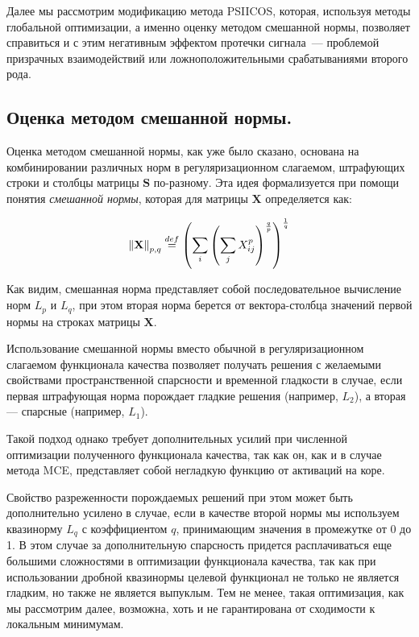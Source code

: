Далее мы рассмотрим модификацию метода PSIICOS, которая, используя методы глобальной
оптимизации, а именно оценку методом смешанной нормы, позволяет справиться и с этим
негативным эффектом протечки сигнала~--- проблемой призрачных взаимодействий
или ложноположительными срабатываниями второго рода.

\subsection{Оценка методом смешанной нормы.}\label{section_mixed_norm}

Оценка методом смешанной нормы, как уже было сказано, основана на
комбинировании различных норм в регуляризационном слагаемом, штрафующих строки
и столбцы матрицы $\mathbf{S}$ по-разному.  Эта идея формализуется при помощи понятия
\emph{смешанной нормы}, которая для матрицы $\mathbf{X}$ определяется как:

\begin{equation}
    \left\lVert\mathbf{X}\right\rVert_{p,q} \stackrel{def}{=}
        {\left(\sum_i {\left( \sum_j X_{ij}^p \right)}^{\frac{q}{p}}\right)}^{\frac{1}{q}}
    \label{mixed_norm_def}
\end{equation}

Как видим, смешанная норма представляет собой последовательное вычисление
норм $L_p$ и $L_q$, при этом вторая норма берется от вектора-столбца значений первой
нормы на строках матрицы $\mathbf{X}$.

Использование смешанной нормы вместо обычной в регуляризационном слагаемом
функционала качества позволяет получать решения с желаемыми свойствами
пространственной спарсности и временной гладкости в случае, если первая штрафующая норма
порождает гладкие решения (например, $L_2$), а вторая --- спарсные (например, $L_1$).

Такой подход однако требует дополнительных усилий при численной оптимизации
полученного функционала качества, так как он, как и в случае метода MCE,
представляет собой негладкую функцию от активаций на коре.

Свойство разреженности порождаемых решений при этом может быть дополнительно
усилено в случае, если в качестве второй нормы мы используем квазинорму $L_q$ с
коэффициентом $q$, принимающим значения в промежутке от 0 до 1. В этом случае
за дополнительную спарсность придется расплачиваться еще большими сложностями в
оптимизации функционала качества, так как при использовании дробной квазинормы
целевой функционал не только не является гладким, но также не является
выпуклым. Тем не менее, такая оптимизация, как мы рассмотрим далее, возможна,
хоть и не гарантирована от сходимости к локальным минимумам.

